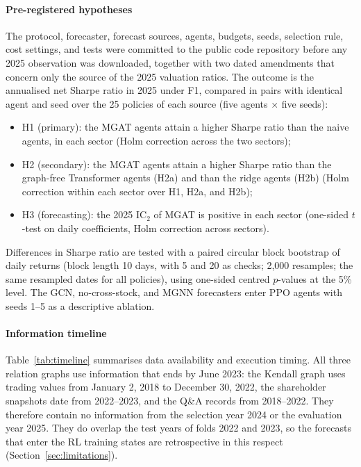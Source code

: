 \paragraph{Pre-registered hypotheses}\label{subsec:hypotheses}
{\color{blue}
The protocol, forecaster, forecast sources, agents, budgets, seeds, selection rule, cost settings, and tests were committed to the public code repository before any 2025 observation was downloaded, together with two dated amendments that concern only the source of the 2025 valuation ratios. The outcome is the annualised net Sharpe ratio in 2025 under F1, compared in pairs with identical agent and seed over the 25 policies of each source (five agents $\times$ five seeds):
\begin{itemize}
\item H1 (primary): the MGAT agents attain a higher Sharpe ratio than the naive agents, in each sector (Holm correction across the two sectors);
\item H2 (secondary): the MGAT agents attain a higher Sharpe ratio than the graph-free Transformer agents (H2a) and than the ridge agents (H2b) (Holm correction within each sector over H1, H2a, and H2b);
\item H3 (forecasting): the 2025 IC$_2$ of MGAT is positive in each sector (one-sided $t$-test on daily coefficients, Holm correction across sectors).
\end{itemize}
Differences in Sharpe ratio are tested with a paired circular block bootstrap of daily returns (block length 10 days, with 5 and 20 as checks; 2{,}000 resamples; the same resampled dates for all policies), using one-sided centred $p$-values at the 5\% level. The GCN, no-cross-stock, and MGNN forecasters enter PPO agents with seeds 1--5 as a descriptive ablation.
\par}

\paragraph{Information timeline}
{\color{blue}
Table~\ref{tab:timeline} summarises data availability and execution timing. All three relation graphs use information that ends by June 2023: the Kendall graph uses trading values from January 2, 2018 to December 30, 2022, the shareholder snapshots date from 2022--2023, and the Q\&A records from 2018--2022. They therefore contain no information from the selection year 2024 or the evaluation year 2025. They do overlap the test years of folds 2022 and 2023, so the forecasts that enter the RL training states are retrospective in this respect (Section~\ref{sec:limitations}).
\par}


